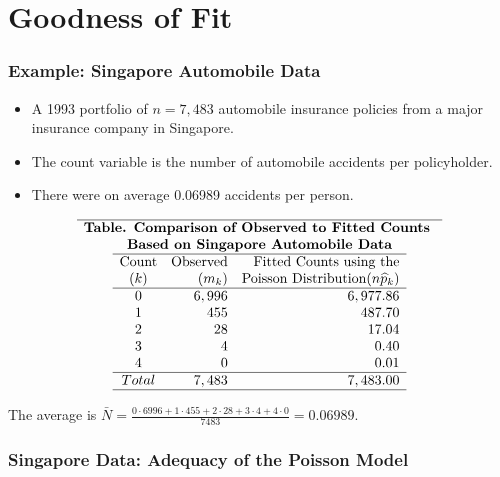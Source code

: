 \documentclass[]{book}
\theoremstyle{definition}
\theoremstyle{definition}
\theoremstyle{definition}
\theoremstyle{remark}
\begin{document}
\section{Goodness of Fit}\label{goodness-of-fit}

\subsubsection{Example: Singapore Automobile
Data}\label{example-singapore-automobile-data}

\begin{itemize}
\item
  A 1993 portfolio of \(n=7,483\) automobile insurance policies from a
  major insurance company in Singapore.
\item
  The count variable is the number of automobile accidents per
  policyholder.
\item
  There were on average 0.06989 accidents per person.
\end{itemize}

\[
\begin{matrix}
\hline \textbf{Table. Comparison of Observed to Fitted Counts } \\
\textbf{Based on Singapore Automobile Data} \\
\begin{array}{crr}
\hline
\text{Count} & \text{Observed} & \text{Fitted Counts using the} \\
(k) & (m_k) & \text{Poisson Distribution} (n\widehat{p}_k) \\
\hline
0 & 6,996 & 6,977.86 \\
1 & 455 & 487.70 \\
2 & 28 & 17.04 \\
3 & 4 & 0.40 \\
4 & 0 & 0.01 \\ \hline Total & 7,483 & 7,483.00 \\ \hline
\end{array}
\end{matrix}\]

The average is
\(\bar{N} = \frac{0\cdot 6996 + 1 \cdot 455 + 2 \cdot 28 + 3 \cdot 4 + 4 \cdot 0}{7483} = 0.06989\).

\subsubsection{Singapore Data: Adequacy of the Poisson
Model}\label{singapore-data-adequacy-of-the-poisson-model}
\end{document}
